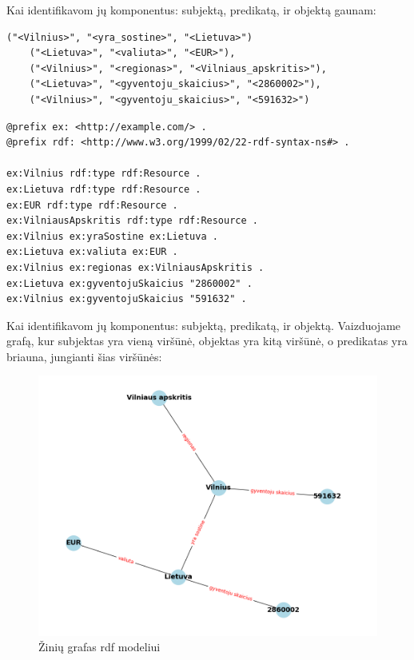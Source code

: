 \documentclass{VUMIFPSkursinis}
\begin{document}
Kai identifikavom jų komponentus: subjektą, predikatą, ir objektą gaunam:
\begin{lstlisting}[captionpos=b, caption=Teiginio subjektas; predikatas ir objektas, label=lst:sparql, basicstyle=\ttfamily,frame=single]
    ("<Vilnius>", "<yra_sostine>", "<Lietuva>")
    ("<Lietuva>", "<valiuta>", "<EUR>"),
    ("<Vilnius>", "<regionas>", "<Vilniaus_apskritis>"),
    ("<Lietuva>", "<gyventoju_skaicius>", "<2860002>"),
    ("<Vilnius>", "<gyventoju_skaicius>", "<591632>")
\end{lstlisting}
\begin{lstlisting}[captionpos=b, caption=Teiginio RDF modelis, label=lst:sparql,
   basicstyle=\ttfamily,frame=single]
@prefix ex: <http://example.com/> .
@prefix rdf: <http://www.w3.org/1999/02/22-rdf-syntax-ns#> .

ex:Vilnius rdf:type rdf:Resource .
ex:Lietuva rdf:type rdf:Resource .
ex:EUR rdf:type rdf:Resource .
ex:VilniausApskritis rdf:type rdf:Resource .
ex:Vilnius ex:yraSostine ex:Lietuva .
ex:Lietuva ex:valiuta ex:EUR .
ex:Vilnius ex:regionas ex:VilniausApskritis .
ex:Lietuva ex:gyventojuSkaicius "2860002" .
ex:Vilnius ex:gyventojuSkaicius "591632" .

\end{lstlisting}

Kai identifikavom jų komponentus: subjektą, predikatą, ir objektą. Vaizduojame grafą, kur subjektas yra vieną viršūnė, objektas yra kitą viršūnė, o predikatas yra briauna, jungianti šias viršūnės:
\begin{figure}[htbp]
  \centering
  \includegraphics[width=1\textwidth]{img/rdf_example.png}
  \caption{Žinių grafas rdf modeliui}
  \label{fig:sample_image}
\end{figure}
\pagebreak
\end{document}
